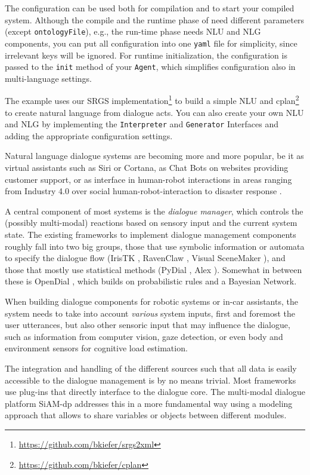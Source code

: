 The configuration can be used both for compilation and to start your compiled
system. Although the compile and the runtime phase of \vonda need different
parameters (except \texttt{ontologyFile}), e.g., the run-time phase needs NLU
and NLG components, you can put all configuration into one \texttt{yaml} file
for simplicity, since irrelevant keys will be ignored. For runtime
initialization, the configuration is passed to the \texttt{init} method of your
\texttt{Agent}, which simplifies configuration also in multi-language settings.

The example uses our SRGS
implementation\footnote{\url{https://github.com/bkiefer/srgs2xml}} to build a
simple NLU and cplan\footnote{\url{https://github.com/bkiefer/cplan}} to create
natural language from dialogue acts. You can also create your own NLU and NLG
by implementing the \texttt{Interpreter} and \texttt{Generator} Interfaces and
adding the appropriate configuration settings.

Natural language dialogue systems are becoming more and more popular, be it as
virtual assistants such as Siri or Cortana, as Chat Bots on websites providing
customer support, or as interface in human-robot interactions in areas ranging
from Industry 4.0 \citep{schwartz2016hybrid} over social human-robot-interaction
\citep{alize2010} to disaster response \citep{kruijff2015tradr}.

A central component of most systems is the \emph{dialogue manager}, which
controls the (possibly multi-modal) reactions based on sensory input and the
current system state. The existing frameworks to implement dialogue management
components roughly fall into two big groups, those that use symbolic
information or automata to specify the dialogue flow (IrisTK
\citep{2012iristk}, RavenClaw \citep{bohus2009ravenclaw}, Visual SceneMaker
\citep{gebhard2012visual}), and those that mostly use statistical methods
(PyDial \cite{ultes2017pydial}, Alex \citep{jurvcivcek2014alex}). Somewhat in
between these is OpenDial \citep{lison2015developing}, which builds on
probabilistic rules and a Bayesian Network.

When building dialogue components for robotic systems or in-car assistants, the system
needs to take into account \emph{various} system inputs, first and foremost the
user utterances, but also other sensoric input that may influence the dialogue,
such as information from computer vision, gaze detection, or even body and
environment sensors for cognitive load estimation.

The integration and handling of the different sources such that all data is
easily accessible to the dialogue management is by no means trivial. Most
frameworks use plug-ins that directly interface to the dialogue core. The
multi-modal dialogue platform SiAM-dp \citep{nesselrath2014siam}
addresses this in a more fundamental way using a modeling approach that allows
to share variables or objects between different modules.

